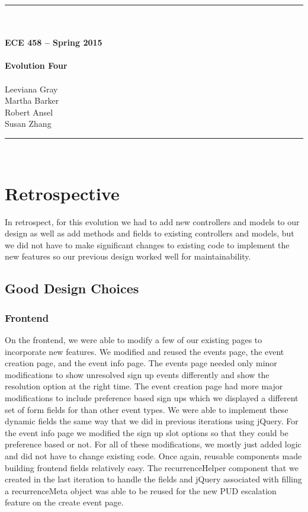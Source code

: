 \documentclass{article}
\begin{document}
\begin{center}
\rule{6.5in}{0.5mm}\\~\\
{\bf \large ECE 458 -- Spring 2015}\\~\\  
{\huge \bf Evolution Four}\\~\\
Leeviana Gray\\
Martha Barker\\
Robert Ansel\\
Susan Zhang\\
\rule{6.5in}{0.5mm}\\
\end{center}
\tableofcontents
\pagebreak

\section{Retrospective}
In retrospect, for this evolution we had to add new controllers and models to our design as well as add methods and fields to existing controllers and models, but we did not have to make significant changes to existing code to implement the new features so our previous design worked well for maintainability.

\subsection{Good Design Choices}
\subsubsection{Frontend}
On the frontend, we were able to modify a few of our existing pages to incorporate new features.  We modified and reused the events page, the event creation page, and the event info page. The events page needed only minor modifications to show unresolved sign up events differently and show the resolution option at the right time. The event creation page had more major modifications to include preference based sign ups which we displayed a different set of form fields for than other event types.  We were able to implement these dynamic fields the same way that we did in previous iterations using jQuery. For the event info page we modified the sign up slot options so that they could be preference based or not. For all of these modifications, we mostly just added logic and did not have to change existing code. Once again, reusable components made building frontend fields relatively easy. The recurrenceHelper component that we created in the last iteration to handle the fields and jQuery associated with filling a recurrenceMeta object was able to be reused for the new PUD escalation feature on the create event page.
\end{document}
